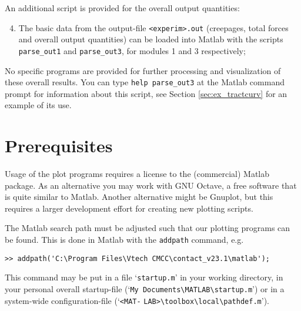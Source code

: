 \documentclass[12pt]{report}
\begin{document}
An additional script is provided for the overall output quantities:
\begin{enumerate}\setcounter{enumi}{3}
\item The basic data from the output-file {\tt <experim>.out} (creepages,
        total forces and overall output quantities) can be loaded into
        Matlab with the scripts {\tt parse\_out1} and {\tt parse\_out3},
        for modules 1 and 3 respectively;
\end{enumerate}
No specific programs are provided for further processing and visualization
of these overall results. You can type {\tt help parse\_out3} at the Matlab
command prompt for information about this script, see Section
\ref{sec:ex_tractcurv} for an example of its use.

\section{Prerequisites}

Usage of the plot programs requires a license to the (commercial) Matlab
package. As an alternative you may work with GNU Octave, a free software
that is quite similar to Matlab. Another alternative might be Gnuplot, but
this requires a larger development effort for creating new plotting
scripts.

The Matlab search path must be adjusted such that our plotting programs can
be found. This is done in Matlab with the {\tt addpath} command, e.g.
\begin{verbatim}
>> addpath('C:\Program Files\Vtech CMCC\contact_v23.1\matlab');
\end{verbatim}
This command may be put in a file `{\tt startup.m}' in your working
directory, in your personal overall startup-file
(`\verb+My Documents\MATLAB\startup.m+') or in a system-wide
configuration-file (`\verb+<MAT-+ \verb+LAB>\toolbox\local\pathdef.m+').
\end{document}
